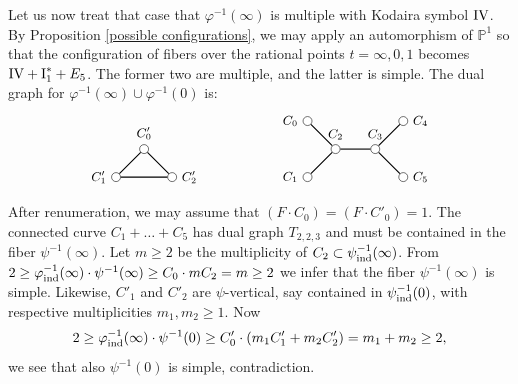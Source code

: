 \documentclass[oneside, 12pt]{amsart}
\theoremstyle{definition}
\theoremstyle{remark}
\newcommand{\PP}{\mathbb{P}}
\newcommand{\I}{\text{\rm I}}
\newcommand{\IV}{\text{\rm IV}}
\newcommand{\ind}{\text{\rm ind}}
\newcommand{\inv}{{-1}}
\begin{document}
Let us now treat that case that  $\varphi^{-1}(\infty)$ is multiple with Kodaira symbol $\IV$.
By  Proposition \ref{possible configurations},  we may apply an automorphism of $\PP^1$ so that 
the  configuration of fibers over the rational points $t=\infty,0,1$ 
becomes $\IV+\I_1^*+E_5$. The former two are multiple, and the latter is simple.
The dual graph for $\varphi^{-1}(\infty)\cup\varphi^{-1}(0)$ is:
\begin{equation*}
\begin{gathered}
\begin{tikzpicture}
[node distance=1cm, font=\small]
\tikzstyle{vertex}=[circle, draw, fill=white, inner sep=0mm, minimum size=1.5ex]
\node[vertex]	(C2)  	at (1,0) [  label=above:{$C_2$}]{};
\node[vertex]	(C3)	[right of=C2,  label=above:{$C_3$}]{};
\node[vertex]	(C0)	[above left of=C2, label=left:{$C_0$}]{};
\node[vertex]	(C1)	[below left of=C2, label=left:{$C_1$}]{};
\node[vertex]	(C4)	[above right of=C3, label=right:{$C_4$}]{};
\node[vertex]	(C5)	[below right of=C3, label=right:{$C_5$}]{};

\node			(R)		[above left of =   C1, xshift=-1cm, label=below:{}]{};
\node			(R')	[above left of =   R,  xshift=-1cm, label=below:{}]{};

\node[vertex]	(C2')	[below left of = R, xshift=-1cm, label=right:{$C_2'$}]{};
\node[vertex]	(C0')	[above left of = C2', label=above:{$C_0'$}]{};
\node[vertex]	(C1')	[below left of = C0', label=left:{$C_1'$}]{};


\draw [thick] (C4)--(C3)--(C5);
\draw [thick] (C0)--(C2)--(C1);
\draw [thick] (C2)--(C3);

\draw[thick] (C0')--(C2')--(C1')--(C0');

\end{tikzpicture}
\end{gathered}
\end{equation*}
After renumeration, we may assume  that $(F\cdot C_0)=(F\cdot C'_0)=1$.
The   connected curve  $C_1+\ldots+C_5$ has dual graph $T_{2,2,3}$ and must be contained in   the fiber $\psi^{-1}(\infty)$.
Let $m\geq 2 $ be the multiplicity of $C_2\subset \psi^\inv_\ind(\infty)$.
From $2\geq \varphi^{-1}_\ind(\infty)\cdot \psi^{-1}(\infty)\geq C_0\cdot mC_2=m\geq 2$ we infer that the fiber $\psi^\inv(\infty)$
is simple. Likewise, $C'_1$ and $C'_2$ are $\psi$-vertical, say contained in $\psi_\ind^{-1}(0)$, with respective multiplicities $m_1,m_2\geq 1$.
Now
$$
2\geq \varphi^{-1}_\ind(\infty)\cdot \psi^{-1}(0)\geq C'_0\cdot (m_1C'_1+m_2C'_2) =m_1+m_2\geq 2,
$$
we see that  also $\psi^\inv(0)$ is simple, contradiction.
\end{document}
